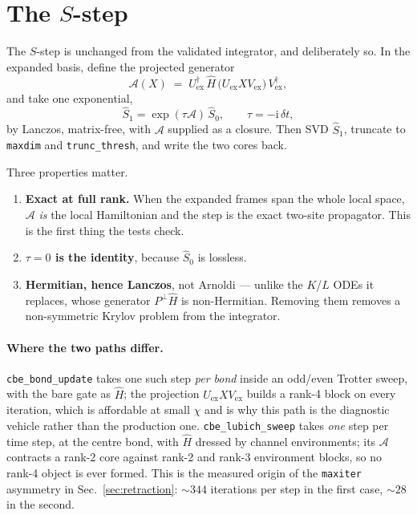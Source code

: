 \documentclass[11pt,a4paper]{article}
\newcommand{\Hb}{\hat{H}}
\newcommand{\Pperp}{P^{\perp}}
\newcommand{\Uex}{U_{\mathrm{ex}}}
\newcommand{\Vex}{V_{\mathrm{ex}}}
\newcommand{\code}[1]{\texttt{\small #1}}
\begin{document}
\section{The $S$-step}
\label{sec:sstep}

The $S$-step is unchanged from the validated integrator, and deliberately so. In the expanded
basis, define the projected generator
\begin{equation}
  \mathcal{A}(X) \;=\; \Uex^\dagger \,\Hb\, \big(\Uex X \Vex\big)\, \Vex^\dagger,
\end{equation}
and take one exponential,
\begin{equation}
  \hat S_1 = \exp(\tau \mathcal{A})\, \hat S_0,
  \qquad \tau = -\mathrm{i}\,\delta t ,
\end{equation}
by Lanczos, matrix-free, with $\mathcal{A}$ supplied as a closure. Then SVD $\hat S_1$, truncate
to \code{maxdim} and \code{trunc\_thresh}, and write the two cores back.

Three properties matter.

\begin{enumerate}[leftmargin=1.4em]
\item \textbf{Exact at full rank.} When the expanded frames span the whole local space,
$\mathcal{A}$ \emph{is} the local Hamiltonian and the step is the exact two-site propagator.
This is the first thing the tests check.
\item \textbf{$\tau = 0$ is the identity}, because $\hat S_0$ is lossless.
\item \textbf{Hermitian, hence Lanczos}, not Arnoldi --- unlike the $K$/$L$ ODEs it replaces,
whose generator $\Pperp\Hb$ is non-Hermitian. Removing them removes a non-symmetric Krylov
problem from the integrator.
\end{enumerate}

\paragraph{Where the two paths differ.} \code{cbe\_bond\_update} takes one such step \emph{per
bond} inside an odd/even Trotter sweep, with the bare gate as $\Hb$; the projection
$\Uex X \Vex$ builds a rank-4 block on every iteration, which is affordable at small $\chi$ and
is why this path is the diagnostic vehicle rather than the production one.
\code{cbe\_lubich\_sweep} takes \emph{one} step per time step, at the centre bond, with $\Hb$
dressed by channel environments; its $\mathcal{A}$ contracts a rank-2 core against rank-2 and
rank-3 environment blocks, so no rank-4 object is ever formed. This is the measured origin of the
\code{maxiter} asymmetry in Sec.~\ref{sec:retraction}: $\sim344$ iterations per step in the
first case, $\sim28$ in the second.
\end{document}
